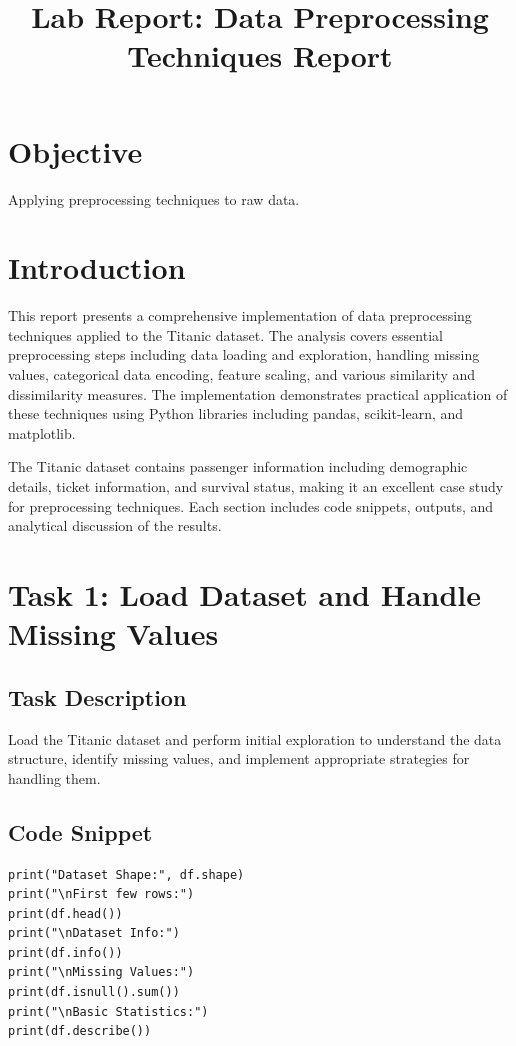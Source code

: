 \documentclass[12pt,a4paper]{article}
\title{\textbf{Lab Report: Data Preprocessing Techniques Report}}
\begin{document}
\maketitle
\section{Objective}
Applying preprocessing techniques to raw data.
\section{Introduction}

This report presents a comprehensive implementation of data preprocessing techniques applied to the Titanic dataset. The analysis covers essential preprocessing steps including data loading and exploration, handling missing values, categorical data encoding, feature scaling, and various similarity and dissimilarity measures. The implementation demonstrates practical application of these techniques using Python libraries including pandas, scikit-learn, and matplotlib.

The Titanic dataset contains passenger information including demographic details, ticket information, and survival status, making it an excellent case study for preprocessing techniques. Each section includes code snippets, outputs, and analytical discussion of the results.

\section{Task 1: Load Dataset and Handle Missing Values}

\subsection{Task Description}
Load the Titanic dataset and perform initial exploration to understand the data structure, identify missing values, and implement appropriate strategies for handling them.

\subsection{Code Snippet}
\begin{lstlisting}
print("Dataset Shape:", df.shape)
print("\nFirst few rows:")
print(df.head())
print("\nDataset Info:")
print(df.info())
print("\nMissing Values:")
print(df.isnull().sum())
print("\nBasic Statistics:")
print(df.describe())
\end{lstlisting}
\end{document}
